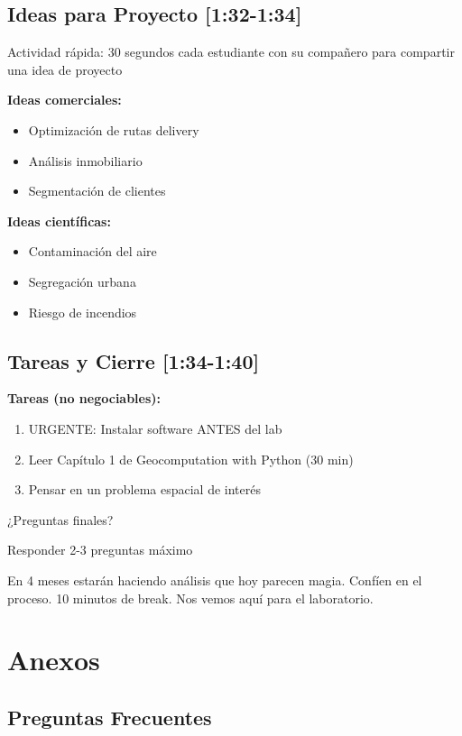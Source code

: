 \documentclass[11pt,a4paper]{article}
\newcommand{\tiempo}[1]{\textcolor{timecolor}{\textbf{[#1]}}}
\newcommand{\decir}[1]{\begin{tcolorbox}[colback=blue!5,colframe=usachblue,title={DECIR}]#1\end{tcolorbox}}
\newcommand{\hacer}[1]{\begin{tcolorbox}[colback=green!5,colframe=green!50!black,title={HACER}]#1\end{tcolorbox}}
\begin{document}
\subsection{Ideas para Proyecto \tiempo{1:32-1:34}}

\hacer{Actividad rápida: 30 segundos cada estudiante con su compañero para compartir una idea de proyecto}

\textbf{Ideas comerciales:}
\begin{itemize}
    \item Optimización de rutas delivery
    \item Análisis inmobiliario
    \item Segmentación de clientes
\end{itemize}

\textbf{Ideas científicas:}
\begin{itemize}
    \item Contaminación del aire
    \item Segregación urbana
    \item Riesgo de incendios
\end{itemize}

\subsection{Tareas y Cierre \tiempo{1:34-1:40}}

\textbf{Tareas (no negociables):}
\begin{enumerate}
    \item URGENTE: Instalar software ANTES del lab
    \item Leer Capítulo 1 de Geocomputation with Python (30 min)
    \item Pensar en un problema espacial de interés
\end{enumerate}

\decir{¿Preguntas finales?}

\hacer{Responder 2-3 preguntas máximo}

\decir{En 4 meses estarán haciendo análisis que hoy parecen magia. Confíen en el proceso. 10 minutos de break. Nos vemos aquí para el laboratorio.}

\newpage

\section{Anexos}

\subsection{Preguntas Frecuentes}
\end{document}
